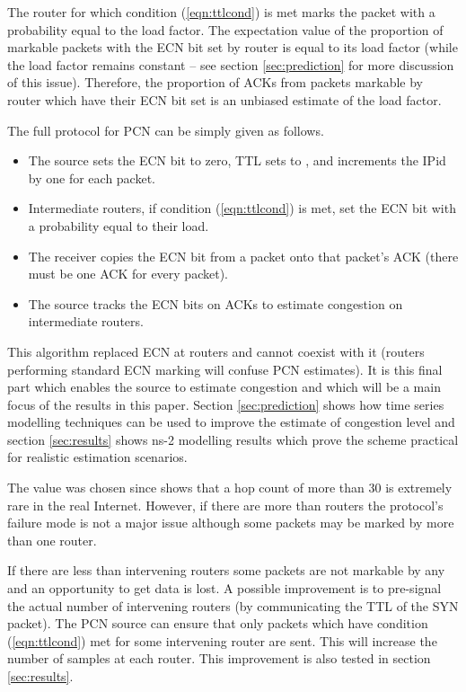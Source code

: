 The router for which condition (\ref{eqn:ttlcond}) is met marks
the packet with a probability equal to the load factor.
The expectation value of the proportion of markable packets with
the ECN bit set by router  is equal to its load factor (while
the load factor remains constant -- see section \ref{sec:prediction}
for more discussion of this issue).
Therefore, the proportion of ACKs from packets
markable by router  which have their ECN
bit set is an unbiased estimate of the load factor.

The full protocol for PCN can be simply given as follows.
\begin{itemize}
\item The source sets the ECN bit to zero, TTL sets to , and
increments the IPid by one
for each packet.
\item Intermediate routers, if condition (\ref{eqn:ttlcond}) is met,
set
the ECN bit with a probability equal to their load.
\item The receiver copies the ECN bit from a packet onto that packet's
ACK (there must be one ACK for every packet).
\item The source tracks the ECN bits on ACKs to estimate congestion
on intermediate routers.
\end{itemize}

This algorithm replaced ECN at routers and cannot coexist with it
(routers performing standard ECN marking will confuse PCN estimates).
It is this final part which enables the source to estimate congestion
and which will be a main focus of the results in this paper.  Section
\ref{sec:prediction} shows how time series modelling techniques can
be used to improve the estimate of congestion level and section
\ref{sec:results} shows ns-2 modelling results which prove the scheme
practical for realistic estimation scenarios.

The value  was chosen since \cite{hopCount}
shows that a hop count of more than 30 is extremely rare in the
real Internet.  However, if there are more than  routers the
protocol's failure mode is not a major issue although some packets may
be marked by more than one router.

If there are less than  intervening routers some packets
are not markable by any and an
opportunity to get data is lost.
A possible improvement is to pre-signal the actual
number of intervening routers (by communicating the TTL of the SYN
packet).  The PCN source can ensure that only packets
which have condition (\ref{eqn:ttlcond}) met for some intervening
router are sent.  This will increase the number of samples at each
router.
This improvement is also tested in section \ref{sec:results}.

